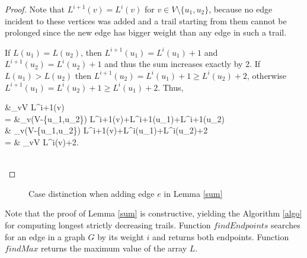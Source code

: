 \begin{isabellebody}
\begin{isamarkuptext}
\begin{proof}
Note that $L^{i+1}(v) = L^i(v)$ for $v\in V \setminus \{u_1,u_2\}$, because no edge incident to these vertices was added and
a trail starting from them cannot be prolonged since the new edge has bigger weight than any edge in such a 
trail.

If $L(u_1)=L(u_2)$, then $L^{i+1}(u_1) = L^i(u_1) + 1$ and $L^{i+1}(u_2) = L^i(u_2)+1$ and thus the sum increases exactly by 2. 
If $L(u_1)>L(u_2)$ then $L^{i+1}(u_2) = L^i(u_1) +1 \ge L^i(u_2)+2$, otherwise $L^{i+1}(u_1) = L^i(u_2) +1 \ge L^i(u_1)+2$. Thus, 

\begin{flalign*}
&\sum_{v\in V} L^{i+1}(v) \\
= &\sum_{v\in (V-\{u_1,u_2\})} L^{i+1}(v)+L^{i+1}(u_1)+L^{i+1}(u_2)\\
\ge & \sum_{v\in (V-\{u_1,u_2\})} L^{i+1}(v)+L^i(u_1)+L^i(u_2)+2\\
= & \sum_{v\in V} L^{i}(v)+2.
\end{flalign*}\\

\end{proof}

\begin{figure}[h]
	\centering
	\caption{Case distinction when adding edge $e$ in Lemma \ref{sum}}\label{cases}
\end{figure}
			

\noindent Note that the proof of Lemma \ref{sum} is constructive, yielding the Algorithm \ref{algo} for computing
longest strictly decreasing trails. Function $findEndpoints$ searches for an edge in a graph $G$ by its weight $i$ and returns
both endpoints. Function $findMax$ returns the maximum value of the array $L$. 


\end{isamarkuptext}
\end{isabellebody}
